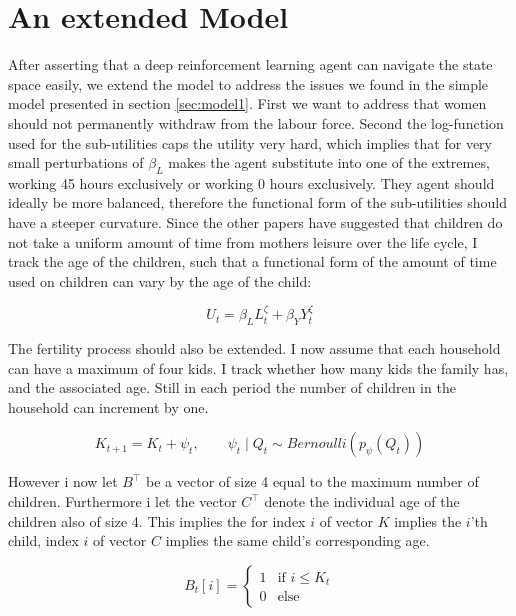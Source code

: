 \section{An extended Model}

After asserting that a deep reinforcement learning agent can navigate the state space easily, we extend the model to address the issues we found in the simple model presented in section \ref{sec:model1}. First we want to address that women should not permanently withdraw from the labour force. Second the log-function used for the sub-utilities caps the utility very hard, which implies that for very small perturbations of $\beta_L$ makes the agent substitute into one of the extremes, working 45 hours exclusively or working 0 hours exclusively. They agent should ideally be more balanced, therefore the functional form of the sub-utilities should have a steeper curvature. Since the other papers have suggested that children do not take a uniform amount of time from mothers leisure over the life cycle, I track the age of the children, such that a functional form of the amount of time used on children can vary by the age of the child:

\begin{equation}
    U_t = \beta_L L_{t}^\zeta + \beta_Y Y_t^{\zeta}
\end{equation}

The fertility process should also be extended. I now assume that each household can have a maximum of four kids. I track whether how many kids the family has, and the associated age. Still in each period the number of children in the household can increment by one.

\begin{equation}
    K_{t+1} = K_t+ \psi_t, \qquad \psi_t \mid Q_t \sim Bernoulli (p_\psi(Q_t))
\end{equation}

However i now let $B^\top$ be a vector of size 4 equal to the maximum number of children. Furthermore i let the vector $C^\top$ denote the individual age of the children also of size 4. This implies the for index $i$ of vector $K$ implies the $i$'th child, index $i$ of vector $C$ implies the same child's corresponding age.

\begin{equation}
    B_t[i]  = \begin{cases}
        1 & \text{if }  i \leq K_t \\
        0 & \text{else}
    \end{cases}
\end{equation}

